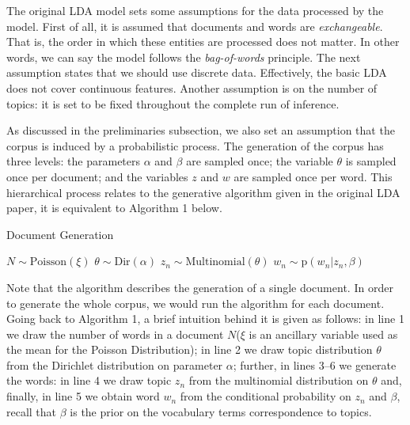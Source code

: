 \documentclass{mprop}
\begin{document}
\par The original LDA model sets some assumptions for the data processed by the model. First of all, it is assumed that documents and words are \textit{exchangeable}. That is, the order in which these entities are processed does not matter. In other words, we can say the model follows the \textit{bag-of-words} principle. The next assumption states that we should use discrete data. Effectively, the basic LDA does not cover  continuous features. Another assumption is on the number of topics: it is set to be fixed throughout the complete run of inference.  

\par As discussed in the preliminaries subsection, we also set an assumption that the corpus is induced by a probabilistic process. The generation of the corpus has three levels: the parameters $\alpha$ and $\beta$ are sampled once; the variable $\theta$ is sampled once per document; and the variables $z$ and $w$ are sampled once per word. This hierarchical process relates to the generative algorithm given in the original LDA paper, it is equivalent to Algorithm 1 below.
\begin{algorithm}[H]
\caption{Document Generation}
\label{alg:document_generation}
\begin{algorithmic}[1]
\State $N \sim \mbox{Poisson}(\xi)$
\State $\theta \sim \mbox{Dir}(\alpha)$
\State $z_n \sim \mbox{Multinomial}(\theta)$
\State $w_n \sim \mbox{p}(w_n | z_n, \beta)$
\EndFor
\end{algorithmic}
\end{algorithm}
Note that the algorithm describes the generation of a single document. In order to generate the whole corpus, we would run the algorithm for each document. Going back to Algorithm 1, a brief intuition behind it is given as follows: in line 1 we draw the number of words in a document $N$($\xi$ is an ancillary variable used as the mean for the Poisson Distribution); in line 2 we draw topic distribution $\theta$ from the Dirichlet distribution on parameter $\alpha$; further, in lines 3--6 we generate the words: in line 4 we draw topic $z_n$ from the multinomial distribution on $\theta$ and, finally, in line 5 we obtain  word $w_n$ from the conditional probability on $z_n$ and $\beta$, recall that $\beta$ is the prior on the vocabulary terms correspondence to topics.
\end{document}
